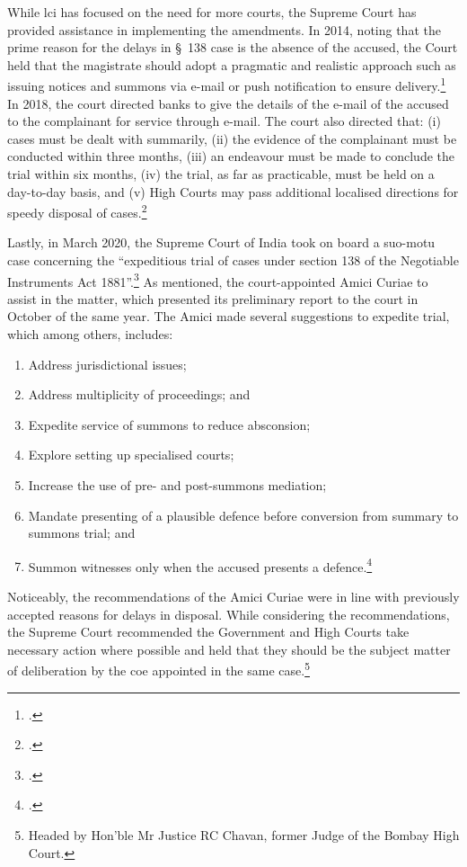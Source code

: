 While \gls{lci} has focused on the need for more courts, the Supreme Court has provided assistance in implementing the amendments. In 2014, noting that the prime reason for the delays in \S~138 case is the absence of the accused, the Court held that the magistrate should adopt a pragmatic and realistic approach such as issuing notices and summons via e-mail or push notification to ensure delivery.\footcite{sc2014_iba} In 2018, the court directed banks to give the details of the e-mail of the accused to the complainant for service through e-mail. The court also directed that: (i) cases must be dealt with summarily, (ii) the evidence of the complainant must be conducted within three months, (iii) an endeavour must be made to conclude the trial within six months, (iv) the trial, as far as practicable, must be held on a day-to-day basis, and (v) High Courts may pass additional localised directions for speedy disposal of cases.\footcite{sc2018_meters}

Lastly, in March 2020, the Supreme Court of India took on board a suo-motu case concerning the “expeditious trial of cases under section 138 of the Negotiable Instruments Act 1881”.\footcite{sc2020_138} As mentioned, the court-appointed Amici Curiae to assist in the matter, which presented its preliminary report to the court in October of the same year. The Amici made several suggestions to expedite trial, which among others, includes:

\begin{enumerate}[label=(\alph*)]
 \item Address jurisdictional issues;
 \item Address multiplicity of proceedings; and
 \item Expedite service of summons to reduce absconsion;
 \item Explore setting up specialised courts;
 \item Increase the use of pre- and post-summons mediation;
 \item Mandate presenting of a plausible defence before conversion from summary to summons trial; and
 \item Summon witnesses only when the accused presents a defence.\footcite{amicus2020_submission}
\end{enumerate}

Noticeably, the recommendations of the Amici Curiae were in line with previously accepted reasons for delays in disposal. While considering the recommendations, the Supreme Court recommended the Government and High Courts take necessary action where possible and held that they should be the subject matter of deliberation by the \gls{coe} appointed in the same case.\footnote{Headed by Hon’ble Mr Justice RC Chavan, former Judge of the Bombay High Court.}

